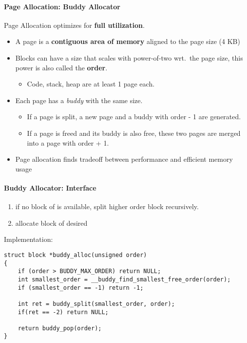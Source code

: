 \paragraph{Page Allocation: Buddy Allocator}
Page Allocation optimizes for \textbf{full utilization}.
\begin{itemize}
    \item A page is a \textbf{contiguous area of memory} aligned to the page size (4 KB)
    \item Blocks can have a size that scales with power-of-two wrt.\ the page size, this power is also called the \textbf{order}.
    \begin{itemize}
        \item Code, stack, heap are at least 1 page each.
    \end{itemize}
    \item Each page has a \textit{buddy} with the same size.
          \begin{itemize}
              \item If a page is split, a new page and a buddy with order - 1 are generated.
              \item If a page is freed and its buddy is also free, these two pages are merged into a page with order + 1.
          \end{itemize}
    \item Page allocation finds tradeoff between performance and efficient memory usage
\end{itemize}

\paragraph{Buddy Allocator: Interface}
\begin{enumerate}
    \item if no block of  is available, split higher order block recursively.
    \item allocate block of desired 
\end{enumerate}

Implementation:
\begin{lstlisting}[style=bright_C++]
struct block *buddy_alloc(unsigned order)
{
    if (order > BUDDY_MAX_ORDER) return NULL;
    int smallest_order = __buddy_find_smallest_free_order(order);
    if (smallest_order == -1) return -1;

    int ret = buddy_split(smallest_order, order);
    if(ret == -2) return NULL;

    return buddy_pop(order);
}
\end{lstlisting}


